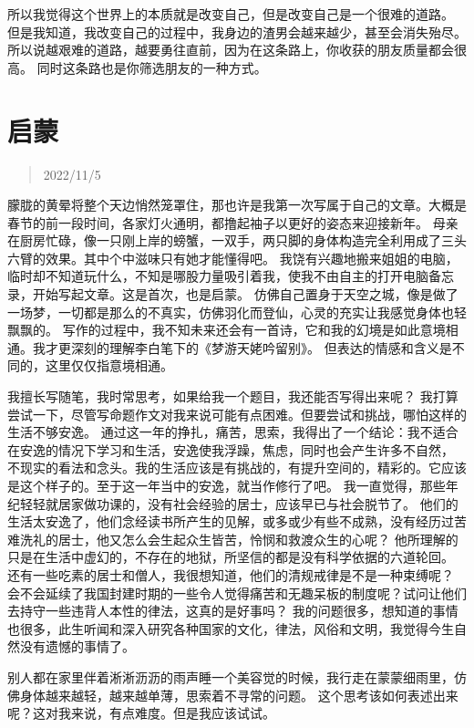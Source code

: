\documentclass[cn,12pt]{elegantbook}
\begin{document}
所以我觉得这个世界上的本质就是改变自己，但是改变自己是一个很难的道路。
但是我知道，我改变自己的过程中，我身边的渣男会越来越少，甚至会消失殆尽。
所以说越艰难的道路，越要勇往直前，因为在这条路上，你收获的朋友质量都会很高。
同时这条路也是你筛选朋友的一种方式。

\newpage
\section{启蒙}
\begin{quotation}
  2022/11/5
\end{quotation}

朦胧的黄晕将整个天边悄然笼罩住，那也许是我第一次写属于自己的文章。大概是春节的前一段时间，各家灯火通明，都撸起袖子以更好的姿态来迎接新年。
母亲在厨房忙碌，像一只刚上岸的螃蟹，一双手，两只脚的身体构造完全利用成了三头六臂的效果。其中个中滋味只有她才能懂得吧。
我饶有兴趣地搬来姐姐的电脑，临时却不知道玩什么，不知是哪股力量吸引着我，使我不由自主的打开电脑备忘录，开始写起文章。这是首次，也是启蒙。
仿佛自己置身于天空之城，像是做了一场梦，一切都是那么的不真实，仿佛羽化而登仙，心灵的充实让我感觉身体也轻飘飘的。
写作的过程中，我不知未来还会有一首诗，它和我的幻境是如此意境相通。我才更深刻的理解李白笔下的《梦游天姥吟留别》。
但表达的情感和含义是不同的，这里仅仅指意境相通。

我擅长写随笔，我时常思考，如果给我一个题目，我还能否写得出来呢？
我打算尝试一下，尽管写命题作文对我来说可能有点困难。但要尝试和挑战，哪怕这样的生活不够安逸。
通过这一年的挣扎，痛苦，思索，我得出了一个结论：我不适合在安逸的情况下学习和生活，安逸使我浮躁，焦虑，同时也会产生许多不自然，
不现实的看法和念头。我的生活应该是有挑战的，有提升空间的，精彩的。它应该是这个样子的。至于这一年当中的安逸，就当作修行了吧。
我一直觉得，那些年纪轻轻就居家做功课的，没有社会经验的居士，应该早已与社会脱节了。
他们的生活太安逸了，他们念经读书所产生的见解，或多或少有些不成熟，没有经历过苦难洗礼的居士，他又怎么会生起众生皆苦，怜悯和救渡众生的心呢？
他所理解的只是在生活中虚幻的，不存在的地狱，所坚信的都是没有科学依据的六道轮回。
还有一些吃素的居士和僧人，我很想知道，他们的清规戒律是不是一种束缚呢？
会不会延续了我国封建时期的一些令人觉得痛苦和无趣呆板的制度呢？试问让他们去持守一些违背人本性的律法，这真的是好事吗？
我的问题很多，想知道的事情也很多，此生听闻和深入研究各种国家的文化，律法，风俗和文明，我觉得今生自然没有遗憾的事情了。

别人都在家里伴着淅淅沥沥的雨声睡一个美容觉的时候，我行走在蒙蒙细雨里，仿佛身体越来越轻，越来越单薄，思索着不寻常的问题。
这个思考该如何表述出来呢？这对我来说，有点难度。但是我应该试试。
\end{document}
